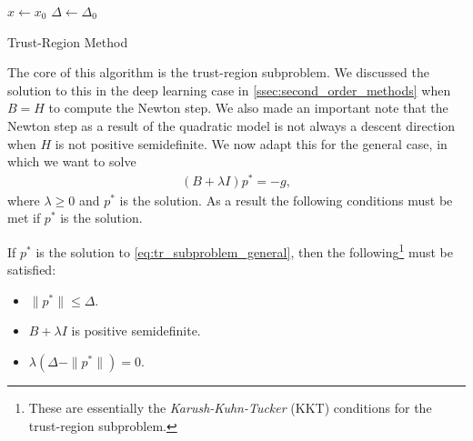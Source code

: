 \begin{algorithm}[h]
    \DontPrintSemicolon
    $x \leftarrow x_0$\;
    $\Delta \leftarrow \Delta_0$\;
    \caption{Trust-Region Method}
    \label{alg:trust_region_algorithm}
\end{algorithm}

The core of this algorithm is the trust-region subproblem. We discussed the solution to this in the deep learning case in \cref{ssec:second_order_methods} when $B = H$ to compute the Newton step. We also made an important note that the Newton step as a result of the quadratic model is not always a descent direction when $H$ is not positive semidefinite. We now adapt this for the general case, in which we want to solve
\begin{align}
    (B + \lambda I) p^* = -g,
    \label{eq:tr_subproblem_general}
\end{align}
where $\lambda \geq 0$ and $p^*$ is the solution. As a result the following conditions must be met if $p^*$ is the solution.

\begin{definition}
    If $p^*$ is the solution to \cref{eq:tr_subproblem_general}, then the following\footnote{These are essentially the \textit{Karush-Kuhn-Tucker} (KKT) conditions for the trust-region subproblem.} must be satisfied:
    \begin{itemize}
        \item $\|p^*\| \leq \Delta$.
        \item $B + \lambda I$ is positive semidefinite.
        \item $\lambda (\Delta - \|p^*\|) = 0$.
    \end{itemize}
    \label{definition:tr_subproblem_conditions}
\end{definition}

